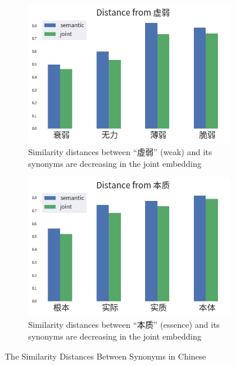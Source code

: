 \begin{figure}[h!]
\begin{CJK}{UTF8}{gbsn}
\begin{subfigure}[b]{0.49\textwidth}
        \label{fig:similarity_zh2}
    \end{subfigure}
    \begin{subfigure}[b]{0.49\textwidth}
        \centering
        \includegraphics[width=\textwidth]{../images/similarity_zh3.png}
        \caption{Similarity distances between ``虛弱'' (weak) and its synonyms are decreasing in the joint embedding}
        \label{fig:similarity_zh3}
    \end{subfigure}
    \begin{subfigure}[b]{0.49\textwidth}
        \centering
        \includegraphics[width=\textwidth]{../images/similarity_zh4.png}
        \caption{Similarity distances between ``本质'' (essence) and its synonyms are decreasing in the joint embedding}
        \label{fig:similarity_zh4}
    \end{subfigure}
    \caption{The Similarity Distances Between Synonyms in Chinese}
	\label{fig:similarity_zh}
\end{CJK}
\end{figure}

